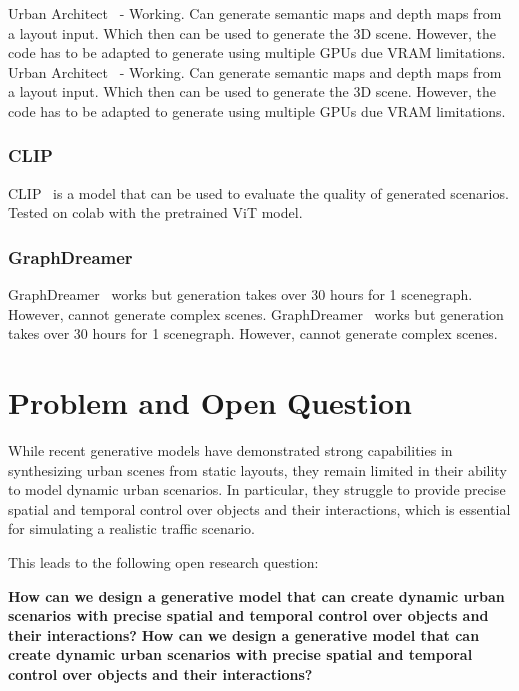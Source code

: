 \documentclass{article}
\begin{document}
Urban Architect~\cite{lu2024urban} - Working. Can generate semantic maps and depth maps from a layout input. Which then can be used to generate the 3D scene. However, the code has to be adapted to generate using multiple GPUs due VRAM limitations.
Urban Architect~\cite{lu2024urban} - Working. Can generate semantic maps and depth maps from a layout input. Which then can be used to generate the 3D scene. However, the code has to be adapted to generate using multiple GPUs due VRAM limitations.

\subsubsection{CLIP}

CLIP~\cite{radford2021learning} is a model that can be used to evaluate the quality of generated scenarios. Tested on colab with the pretrained ViT model.

\subsubsection{GraphDreamer}

GraphDreamer~\cite{gao2024graphdreamer} works but generation takes over 30 hours for 1 scenegraph. However, cannot generate complex scenes.
GraphDreamer~\cite{gao2024graphdreamer} works but generation takes over 30 hours for 1 scenegraph. However, cannot generate complex scenes.

\section{Problem and Open Question}

While recent generative models have demonstrated strong capabilities in synthesizing urban scenes from static layouts, they remain limited in their ability to model dynamic urban scenarios. In particular, they struggle to provide precise spatial and temporal control over objects and their interactions, which is essential for simulating a realistic traffic scenario.

This leads to the following open research question:

\textbf{How can we design a generative model that can create dynamic urban scenarios with precise spatial and temporal control over objects and their interactions?}
\textbf{How can we design a generative model that can create dynamic urban scenarios with precise spatial and temporal control over objects and their interactions?}
\end{document}
